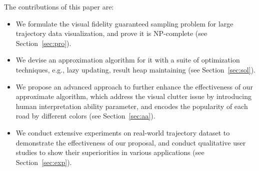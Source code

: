 The contributions of this paper are:
\begin{itemize}[noitemsep]
  \item We formulate the visual fidelity guaranteed sampling problem for large trajectory data visualization, and prove it is NP-complete (see Section~\ref{sec:pro}).
  \item We devise an approximation algorithm for it with a suite of optimization techniques, e.g., lazy updating, result heap maintaining (see Section~\ref{sec:sol}).
  \item We propose an advanced approach to further enhance the effectiveness of our approximate algorithm, which address the visual clutter issue by introducing human interpretation ability parameter,
  and encodes the popularity of each road by different colors (see Section~\ref{sec:aa}).
  \item We conduct extensive experiments on real-world trajectory dataset to demonstrate the effectiveness of our proposal, and conduct qualitative user studies to show their superiorities in various applications
  (see Section~\ref{sec:exp}).
\end{itemize}



%


